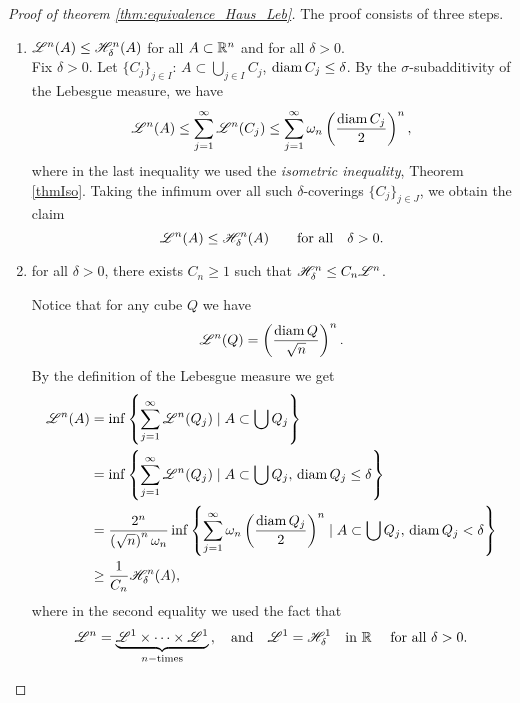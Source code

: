\begin{proof}[Proof of theorem \ref{thm:equivalence_Haus_Leb}]
The proof consists of three steps.~
\begin{enumerate}
\item $\mathscr{L}^{n}(A) \leq \mathscr{H}^{n}_{\delta}(A)$ for all $A \subset \mathbb{R}^n$ and for all $\delta > 0$.
\\
Fix $\delta > 0$. Let $\{C_j\}_{j\in I}$: $A \subset \bigcup_{j\in I} C_j$, $\operatorname{diam}
C_j \leq \delta$. By the $\sigma$-subadditivity of the Lebesgue measure, we have
\[
\mathscr{L}^{n}(A) \leq \sum_{j=1}^\infty \mathscr{L}^{n}(C_j) \leq
\sum_{j=1}^\infty \omega_n \left(\frac{\operatorname{diam} C_j}{2}\right)^n,
\]
where in the last inequality we used the \emph{isometric
inequality}, Theorem \ref{thmIso}. Taking the
infimum over all such $\delta$-coverings $\{C_j\}_{j \in J}$, we obtain the claim
\[
\mathscr{L}^{n}(A) \leq \mathscr{H}^{n}_\delta (A) \qquad \text{for all} \quad
\delta > 0.
\]
\item for all $\delta > 0$, there exists $C_{n} \geq 1$ such that $\mathscr{H}^{n}_{\delta} \leq C_n \mathscr{L}^{n}$.

Notice that for any cube $Q$ we have
\begin{equation*}
\mathscr{L}^{n}(Q) = \left(\frac{ \operatorname{diam} Q}{\sqrt{n}}\right)^n.
\end{equation*}
By the definition of the Lebesgue measure we get
\[
\begin{aligned}
\mathscr{L}^{n}(A) 
&= \inf\left\{ \sum_{j=1}^\infty \mathscr{L}^{n}(Q_j) \mid A
\subset \bigcup Q_j\right\}
\\& = \inf\left\{ \sum_{j=1}^\infty \mathscr{L}^{n}(Q_j) \mid A
\subset \bigcup Q_j,\, \operatorname{diam} Q_j \le \delta \right\}
\\& = \frac{2^n}{\left(\sqrt{n}\right)^n \omega_n} \inf
\left\{\sum_{j=1}^\infty \omega_n \left(\frac{\operatorname{diam} Q_j}{2}\right)^n \mid 
A \subset \bigcup Q_j,\, \operatorname{diam} Q_j < \delta\right\}
\\&\geq \frac{1}{C_n} \mathscr{H}^{n}_\delta (A),
\end{aligned}
\]
where in the second equality we used the fact that 
\[
\mathscr{L}^{n} = \underbrace{\mathscr{L}^{1} \times \dots \times \mathscr{L}^{1}}_{n-\text{times}}\,,
\quad \text{and} \quad
\mathscr{L}^{1} = \mathscr{H}^{1}_\delta \quad \text{in } \mathbb{R} \quad \text{ for all } \delta > 0.
\]


\end{enumerate}
\end{proof}
